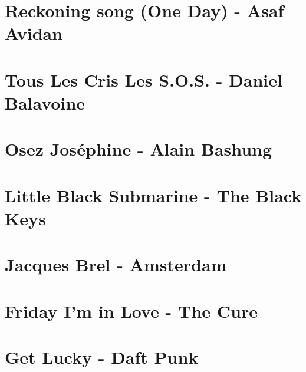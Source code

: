 \documentclass{guitartabs}
\begin{document}
\linespread{0.3}
\tableofcontents
\newpage

\linespread{1}


\section{Reckoning song (One Day) - Asaf Avidan}
\begin{guitar}

\end{guitar}


\section{Tous Les Cris Les S.O.S. - Daniel Balavoine}
\begin{guitar}

\end{guitar}

\section{Osez Joséphine - Alain Bashung}
\begin{guitar}

\end{guitar}



\section{Little Black Submarine - The Black Keys}
\begin{guitar}

\end{guitar}

\section{Jacques Brel - Amsterdam}
\begin{guitar}

\end{guitar}


\section{Friday I'm in Love - The Cure}
\begin{guitar}

\end{guitar}


\section{Get Lucky - Daft Punk}
\begin{guitar}

\end{guitar}
\end{document}
